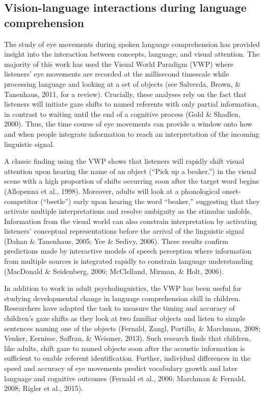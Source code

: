 \documentclass[,man,floatsintext]{apa6}
\begin{document}
\hypertarget{vision-language-interactions-during-language-comprehension}{%
\subsection{Vision-language interactions during language
comprehension}\label{vision-language-interactions-during-language-comprehension}}

The study of eye movements during spoken language comprehension has
provided insight into the interaction between concepts, language, and
visual attention. The majority of this work has used the Visual World
Paradigm (VWP) where listeners' eye movements are recorded at the
millisecond timescale while processing language and looking at a set of
objects (see Salverda, Brown, \& Tanenhaus, 2011, for a review).
Crucially, these analyses rely on the fact that listeners will initiate
gaze shifts to named referents with only partial information, in
contrast to waiting until the end of a cognitive process (Gold \&
Shadlen, 2000). Thus, the time course of eye movements can provide a
window onto how and when people integrate information to reach an
interpretation of the incoming linguistic signal.

A classic finding using the VWP shows that listeners will rapidly shift
visual attention upon hearing the name of an object (\enquote{Pick up a
beaker.}) in the visual scene with a high proportion of shifts occurring
soon after the target word begins (Allopenna et al., 1998). Moreover,
adults will look at a phonological onset-competitor (\enquote{beetle})
early upon hearing the word \enquote{beaker,} suggesting that they
activate multiple interpretations and resolve ambiguity as the stimulus
unfolds. Information from the visual world can also constrain
interpretation by activating listeners' conceptual representations
before the arrival of the linguistic signal (Dahan \& Tanenhaus, 2005;
Yee \& Sedivy, 2006). These results confirm predictions made by
interactive models of speech perception where information from multiple
sources is integrated rapidly to constrain language understanding
(MacDonald \& Seidenberg, 2006; McClelland, Mirman, \& Holt, 2006).

In addition to work in adult psycholinguistics, the VWP has been useful
for studying developmental change in language comprehension skill in
children. Researchers have adapted the task to measure the timing and
accuracy of children's gaze shifts as they look at two familiar objects
and listen to simple sentences naming one of the objects (Fernald,
Zangl, Portillo, \& Marchman, 2008; Venker, Eernisse, Saffran, \&
Weismer, 2013). Such research finds that children, like adults, shift
gaze to named objects soon after the acoustic information is sufficient
to enable referent identification. Further, individual differences in
the speed and accuracy of eye movements predict vocabulary growth and
later language and cognitive outcomes (Fernald et al., 2006; Marchman \&
Fernald, 2008; Rigler et al., 2015).
\end{document}
